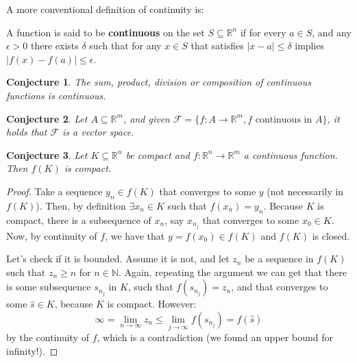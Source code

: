 \documentclass[aspectratio=169]{beamer}
\newtheorem{proposition}{Conjecture}[section]
\begin{document}
\begin{frame}
    
    A more conventional definition of continuity is:
    
    \begin{definition}
     A function is said to be \textbf{continuous} on the set $S\subseteq\mathds{R}^n$ if for every $a\in S$, and any $\epsilon>0$ there exists $\delta$ such that for any $x\in S$ that satisfies $|x-a|\leq \delta$ implies $|f(x)-f(a)|\leq \epsilon$.
    \end{definition}
    
    
\end{frame}

\begin{frame}

    \begin{proposition}
        The sum, product, division or composition of continuous functions is continuous.
    \end{proposition}

    \begin{proposition}
        Let $A\subseteq\mathds{R}^m$, and given $\mathcal{F}=\{f:A\rightarrow\mathds{R}^m, f \text{ continuous in } A\}$, it holds that $\mathcal{F}$ is a vector space.
    \end{proposition}
\end{frame}

\begin{frame}
    \begin{proposition}
        Let $K\subseteq\mathds{R}^n$ be compact and $f:\mathds{R}^n\rightarrow\mathds{R}^m$ a continuous function. Then $f(K)$ is compact.
    \end{proposition}
\end{frame}

\begin{frame}
    \begin{proof}
        Take a sequence $y_n\in f(K)$ that converges to some $y$ (not necessarily in $f(K)$). Then, by definition $\exists x_n\in K$ such that $f(x_n)=y_n$. Because $K$ is compact,
        there is a subsequence of $x_n$, say $x_{n_j}$ that converges to some $x_0\in K$. Now, by continuity of $f$, we have that $y=f(x_0)\in f(K)$ and $f(K)$ is closed.

        \vspace{0.5em}

        Let's check if it is bounded. Assume it is not, and let $z_n$ be a sequence in $f(K)$ such that $z_n\geq n$ for $n\in\mathds{N}$. Again, repeating the argument we can get that there is some
        subsequence $s_{n_j}$ in $K$, such that $f(s_{n_j})=z_n$, and that converges to some $\hat{s}\in K$, because $K$ is compact. However:
        \[\infty = \lim_{n\rightarrow\infty}z_n\leq \lim_{j\rightarrow\infty} f(s_{n_j})=f(\hat{s})\]
        by the continuity of $f$, which is a contradiction (we found an upper bound for infinity!).
    \end{proof}
\end{frame}
\end{document}
